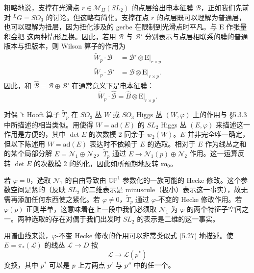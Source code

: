 \documentclass[11pt,a4paper]{article}
\begin{document}
粗略地说，支撑在光滑点 $r\in\mathcal{M}_H(SL_2)$ 的点层给出电本征膜 $\mathcal{B}$，正如我们先前对 ${}^{L}G=SO_3$ 的讨论。但这略有简化。支撑在点 $r$ 的点层既可以理解为普通层，也可以理解为扭层，因为扭化涉及的 gerbe 在限制到光滑点时平凡。与 $\mathrm{E}$ 作张量积会把
这两种情形互换。因此，若用 $\mathcal{B}$ 与 $\mathcal{B}'$ 分别表示与点层相联系的膜的普通版本与扭版本，则 Wilson 算子的作用为
\begin{equation}\tag{5.35}
\begin{aligned}
\widetilde{W}_p\cdot\mathcal{B} &= \mathcal{B}'\otimes\mathrm{E}|_{r\times p}\\
\widetilde{W}_p\cdot\mathcal{B}' &= \mathcal{B}\otimes\mathrm{E}|_{r\times p}.
\end{aligned}
\end{equation}
因此，和 $\widehat{\mathcal{B}}=\mathcal{B}\oplus\mathcal{B}'$ 在通常意义下是电本征膜：
\begin{equation}\tag{5.36}
\widetilde{W}_p\cdot\widehat{\mathcal{B}}=\widehat{B}\otimes\mathrm{E}|_{r\times p}.
\end{equation}

对偶 't Hooft 算子 $\widetilde{T}_p$ 在 $SO_3$ 丛 $W$ 或 $SO_3$ Higgs 丛 $(W,\varphi)$ 上的作用与 §5.3.3 中所描述的相当类似。用使得 $W=\mathrm{ad}(E)$ 的 $SL_2$ Higgs 丛 $(E,\varphi)$ 来描述这一作用是方便的，其中 $\det E$ 的次数模 2 同余于 $w_2(W)$。$E$ 并非完全唯一确定，但以下陈述用 $W=\mathrm{ad}(E)$ 表达时不依赖于 $E$ 的选取。相对于 $E$ 作为线丛之和的某个局部分解 $E=\mathcal{N}_1\oplus\mathcal{N}_2$，$\widetilde{T}_p$ 通过 $E\to\mathcal{N}_1(p)\oplus\mathcal{N}_2$ 作用。这一运算反转 $\det E$ 的次数模 2 的约化，因此如所预期地反转 $\boldsymbol{m}_0$。

若 $\varphi=0$，选取 $\mathcal{N}_1$ 的自由导致由 $\mathbb{CP}^1$ 参数化的一族可能的 Hecke 修改。这个参数空间是紧的（反映 $SL_2$ 的二维表示是 minuscule（极小）表示这一事实），故无需再添加任何东西使之紧化。若 $\varphi\neq0$，$\widetilde{T}_p$ 通过 $\varphi$-不变的 Hecke 修改作用。若 $\varphi(p)$ 正则半单，这意味着在上一段中我们必须取 $\mathcal{N}_1$ 为 $\varphi$ 的两个特征子空间之一。两种选取的存在对偶于我们出发时 $SL_2$ 的表示是二维的这一事实。

用谱曲线来说，$\varphi$-不变 Hecke 修改的作用可以非常类似式 (5.27) 地描述。使 $E=\pi_*(\mathcal{L})$ 的线丛 $\mathcal{L}\to D$ 按
\begin{equation}\tag{5.37}
\mathcal{L}\to\mathcal{L}(p^*)
\end{equation}
变换，其中 $p^*$ 可以是 $p$ 上方两点 $p'$ 与 $p''$ 中的任一个。
\end{document}
